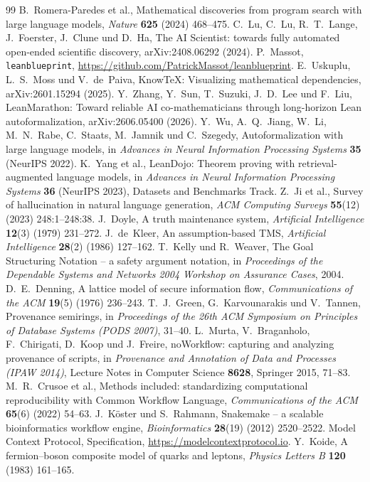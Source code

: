\documentclass[11pt]{article}
\theoremstyle{definition}
\theoremstyle{remark}
\begin{document}
\begin{thebibliography}{99}
 B.~Romera-Paredes et al., Mathematical discoveries from program search with large language models, \emph{Nature}
\textbf{625} (2024) 468--475.
 C.~Lu, C.~Lu, R.~T.~Lange, J.~Foerster, J.~Clune und D.~Ha, The AI Scientist: towards fully automated open-ended
scientific discovery, arXiv:2408.06292 (2024).
 P.~Massot, \texttt{leanblueprint}, \url{https://github.com/PatrickMassot/leanblueprint}.
 E.~Uskuplu, L.~S.~Moss und V.~de~Paiva, KnowTeX: Visualizing mathematical dependencies, arXiv:2601.15294 (2025).
 Y.~Zhang, Y.~Sun, T.~Suzuki, J.~D.~Lee und F.~Liu, LeanMarathon: Toward reliable AI co-mathematicians through
long-horizon Lean autoformalization, arXiv:2606.05400 (2026).
 Y.~Wu, A.~Q.~Jiang, W.~Li, M.~N.~Rabe, C.~Staats, M.~Jamnik und C.~Szegedy, Autoformalization with large language models,
in \emph{Advances in Neural Information Processing Systems} \textbf{35} (NeurIPS 2022).
 K.~Yang et al., LeanDojo: Theorem proving with retrieval-augmented language models, in \emph{Advances in Neural
Information Processing Systems} \textbf{36} (NeurIPS 2023), Datasets and Benchmarks Track.
 Z.~Ji et al., Survey of hallucination in natural language generation, \emph{ACM Computing Surveys} \textbf{55}(12) (2023)
248:1--248:38.
 J.~Doyle, A truth maintenance system, \emph{Artificial Intelligence} \textbf{12}(3) (1979) 231--272.
 J.~de~Kleer, An assumption-based TMS, \emph{Artificial Intelligence} \textbf{28}(2) (1986) 127--162.
 T.~Kelly und R.~Weaver, The Goal Structuring Notation -- a safety argument notation, in \emph{Proceedings of the Dependable
Systems and Networks 2004 Workshop on Assurance Cases}, 2004.
 D.~E.~Denning, A lattice model of secure information flow, \emph{Communications of the ACM} \textbf{19}(5) (1976) 236--243.
 T.~J.~Green, G.~Karvounarakis und V.~Tannen, Provenance semirings, in \emph{Proceedings of the 26th ACM Symposium on
Principles of Database Systems (PODS 2007)}, 31--40.
 L.~Murta, V.~Braganholo, F.~Chirigati, D.~Koop und J.~Freire, noWorkflow: capturing and analyzing provenance of
scripts, in \emph{Provenance and Annotation of Data and Processes (IPAW 2014)}, Lecture Notes in Computer Science \textbf{8628},
Springer 2015, 71--83.
 M.~R.~Crusoe et al., Methods included: standardizing computational reproducibility with Common Workflow Language,
\emph{Communications of the ACM} \textbf{65}(6) (2022) 54--63.
 J.~Köster und S.~Rahmann, Snakemake -- a scalable bioinformatics workflow engine, \emph{Bioinformatics}
\textbf{28}(19) (2012) 2520--2522.
 Model Context Protocol, Specification, \url{https://modelcontextprotocol.io}.
 Y.~Koide, A fermion--boson composite model of quarks and leptons, \emph{Physics Letters B} \textbf{120} (1983) 161--165.
\end{thebibliography}
\endgroup
\end{document}
